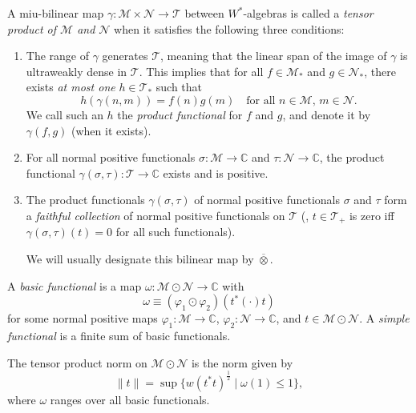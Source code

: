 \begin{definition}
  A miu-bilinear map \( \gamma: \mathscr{M} \times \mathscr{N} \to \mathscr{T} \) between $W^*$-algebras is called a \emph{tensor product of \( \mathscr{M} \) and \( \mathscr{N} \)} when it satisfies the following three conditions:

\begin{enumerate}
    \item The range of \( \gamma \) generates \( \mathscr{T} \), meaning that the linear span of the image of \( \gamma \) is ultraweakly dense in \( \mathscr{T} \). This implies that for all \( f \in \mathscr{M}_* \) and \( g \in \mathscr{N}_* \), there exists \emph{at most one} \( h \in \mathscr{T}_* \) such that
    \[
    h(\gamma(n, m)) = f(n) g(m) \quad \text{for all } n \in \mathscr{M}, \, m \in \mathscr{N}.
    \]
    We call such an \( h \) the \emph{product functional} for \( f \) and \( g \), and denote it by \( \gamma(f, g) \) (when it exists).

    \item For all normal positive functionals \( \sigma: \mathscr{M} \to \mathbb{C} \) and \( \tau: \mathscr{N} \to \mathbb{C} \), the product functional \( \gamma(\sigma, \tau): \mathscr{T} \to \mathbb{C} \) exists and is positive.

    \item The product functionals \( \gamma(\sigma, \tau) \) of normal positive functionals \( \sigma \) and \( \tau \) form a \emph{faithful collection} of normal positive functionals on \( \mathscr{T} \) (\ie, \( t \in \mathscr{T}_+ \) is zero iff \( \gamma(\sigma, \tau)(t) = 0 \) for all such functionals).

We will usually designate this bilinear map by $\overline{\otimes}$.
\end{enumerate}
\end{definition}

\begin{definition}
  A \emph{basic functional} is a map $\omega: \mathscr{M} \odot \mathscr{N} \to \mathbb{C}$ with
\[
\omega \equiv (\varphi_1 \odot \varphi_2)(t^{*}(\cdot)t)
\]
for some normal positive maps $\varphi_1: \mathscr{M} \to \mathbb{C}$, $\varphi_2: \mathscr{N} \to \mathbb{C}$, and $t \in \mathscr{M} \odot \mathscr{N}$. A \emph{simple functional} is a finite sum of basic functionals.
\end{definition}

\begin{definition}
  The tensor product norm on $\mathscr{M} \odot \mathscr{N}$ is the norm  given by
\[
\|t\| = \sup \{ w(t^*t)^{\frac{1}{2}} \mid \omega(1) \leq 1 \},
\]
where $\omega$ ranges over all basic functionals.
\end{definition}


